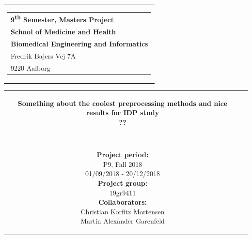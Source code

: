 % 
\thispagestyle{empty}
\begin{titlepage}
\begin{nopagebreak}
{\samepage 

\begin{tabular}{r}
\parbox{\textwidth}{  
\hfill \hspace{2cm} \parbox{8cm}{\begin{tabular}{l} %
{\small \textbf{\textcolor{aaublue}{{9\textsuperscript{th} Semester, Masters Project}}}}\\
{\small \textbf{\textcolor{aaublue}{School of Medicine and Health}}}\\
{\small \textbf{\textcolor{aaublue}{Biomedical Engineering and Informatics}}}\\
{\small \textcolor{aaublue}{Fredrik Bajers Vej 7A}} \\
{\small \textcolor{aaublue}{9220 Aalborg}} \\
\end{tabular}}}
\end{tabular}

\begin{tabular}{cc}
\parbox{7cm}{

\textbf{Something about the coolest preprocessing methods and nice results for IDP study}
\\
\textbf{??}

\small{
\\
}


\parbox{8cm}{


\textbf{Project period:}\\
P9, Fall 2018\\
01/09/2018 - 20/12/2018\\
   
\textbf{Project group:}\\
19gr9411\\ %
  
\textbf{Collaborators:}\\
Christian Korfitz Mortensen \\
Martin Alexander Garenfeld


}}
\end{tabular}}
\end{nopagebreak}
\end{titlepage}
